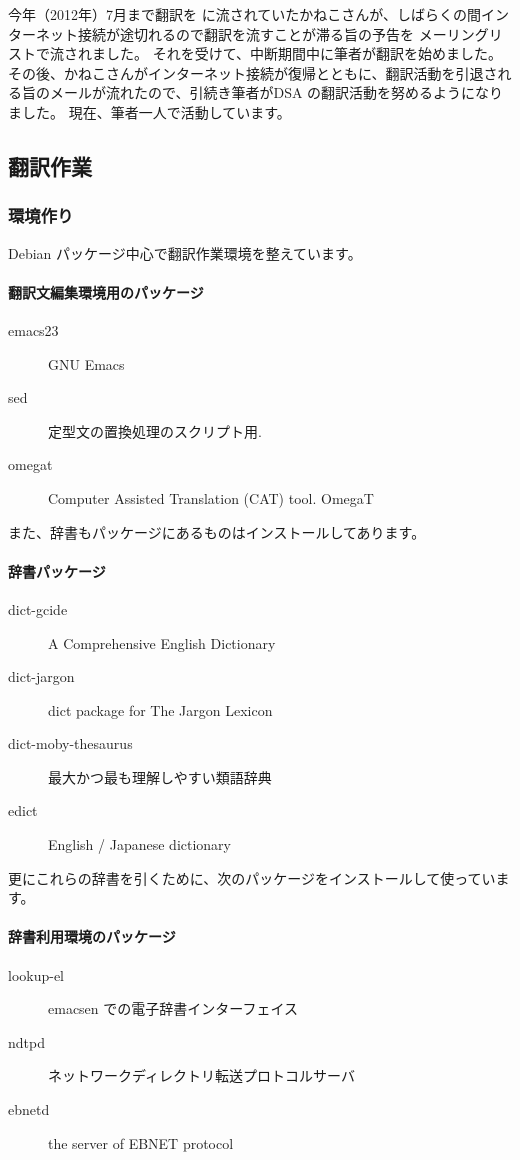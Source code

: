 \documentclass[mingoth,a4paper]{jsarticle}
\begin{document}
今年（2012年）7月まで翻訳を  に流されていたかねこさんが、しばらくの間インターネット接続が途切れるので翻訳を流すことが滞る旨の予告を  メーリングリストで流されました。
それを受けて、中断期間中に筆者が翻訳を始めました。その後、かねこさんがインターネット接続が復帰とともに、翻訳活動を引退される旨のメールが流れたので、引続き筆者がDSA の翻訳活動を努めるようになりました。
現在、筆者一人で活動しています。


\subsection{翻訳作業}

\subsubsection{環境作り}

Debian パッケージ中心で翻訳作業環境を整えています。

\paragraph{翻訳文編集環境用のパッケージ}

\begin{description}
\item[emacs23] GNU Emacs
\item[sed] 定型文の置換処理のスクリプト用.
\item[omegat] Computer Assisted Translation (CAT) tool. OmegaT
\end{description}

また、辞書もパッケージにあるものはインストールしてあります。

\paragraph{辞書パッケージ}
\begin{description}
\item[dict-gcide] A Comprehensive English Dictionary
\item[dict-jargon] dict package for The Jargon Lexicon
\item[dict-moby-thesaurus] 最大かつ最も理解しやすい類語辞典
\item[edict] English / Japanese dictionary
\end{description}

更にこれらの辞書を引くために、次のパッケージをインストールして使っています。
\paragraph{辞書利用環境のパッケージ}
\begin{description}
\item[lookup-el] emacsen での電子辞書インターフェイス
\item[ndtpd] ネットワークディレクトリ転送プロトコルサーバ
\item[ebnetd] the server of EBNET protocol
\end{description}
\end{document}
